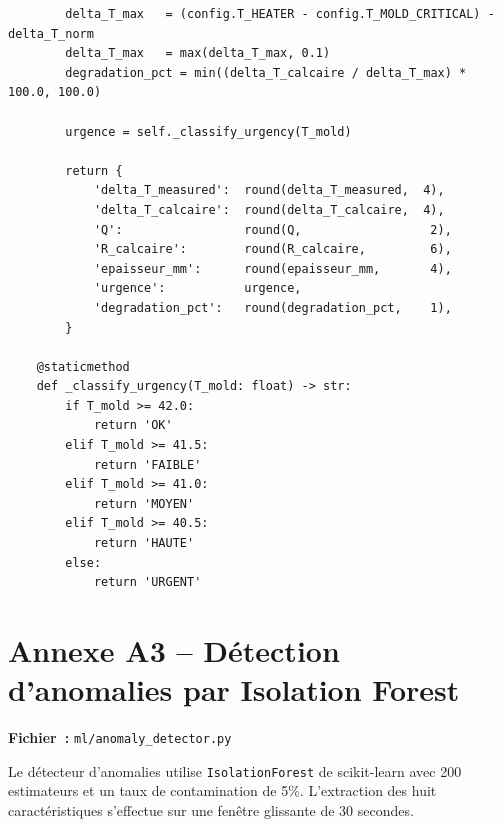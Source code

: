 \begin{lstlisting}
        delta_T_max   = (config.T_HEATER - config.T_MOLD_CRITICAL) - delta_T_norm
        delta_T_max   = max(delta_T_max, 0.1)
        degradation_pct = min((delta_T_calcaire / delta_T_max) * 100.0, 100.0)

        urgence = self._classify_urgency(T_mold)

        return {
            'delta_T_measured':  round(delta_T_measured,  4),
            'delta_T_calcaire':  round(delta_T_calcaire,  4),
            'Q':                 round(Q,                  2),
            'R_calcaire':        round(R_calcaire,         6),
            'epaisseur_mm':      round(epaisseur_mm,       4),
            'urgence':           urgence,
            'degradation_pct':   round(degradation_pct,    1),
        }

    @staticmethod
    def _classify_urgency(T_mold: float) -> str:
        if T_mold >= 42.0:
            return 'OK'
        elif T_mold >= 41.5:
            return 'FAIBLE'
        elif T_mold >= 41.0:
            return 'MOYEN'
        elif T_mold >= 40.5:
            return 'HAUTE'
        else:
            return 'URGENT'
\end{lstlisting}

\section{Annexe A3 -- Détection d'anomalies par Isolation Forest}
\label{annexe:anomaly}

\textbf{Fichier~:} \texttt{ml/anomaly\_detector.py}

Le détecteur d'anomalies utilise \texttt{IsolationForest} de scikit-learn avec 200 estimateurs et un taux de contamination de 5\%. L'extraction des huit caractéristiques s'effectue sur une fenêtre glissante de 30 secondes.

